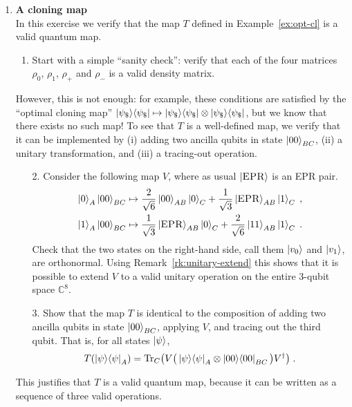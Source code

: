 \documentclass[12pt]{article}
\begin{document}
\begin{enumerate}
\item {\bf A cloning map}\label{ex:2-qmamp}\\
In this exercise we verify that the map $T$ defined in Example~\ref{ex:opt-cl} is a valid quantum map. 
\begin{enumerate}
\item Start with a simple ``sanity check'': verify that each of the four matrices $\rho_0$, $\rho_1$, $\rho_+$ and $\rho_-$ is a valid density matrix. 
\end{enumerate}
However, this is not enough: for example, these conditions are satisfied by the ``optimal cloning map'' $\ket{\psi_\$}\!\bra{\psi_\$}\mapsto \ket{\psi_\$}\!\bra{\psi_\$}\otimes \ket{\psi_\$}\!\bra{\psi_\$}$, but we know that there exists no such map! To see that $T$ is a well-defined map, we verify that it can be implemented by (i) adding two ancilla qubits in state $\ket{00}_{BC}$, (ii) a unitary transformation, and (iii) a tracing-out operation. 
\begin{enumerate}
\item[2.] Consider the following map $V$, where as usual $\ket{\textsc{EPR}}$ is an EPR pair.  
\begin{align*}
\ket{0}_A \ket{00}_{BC} \mapsto \frac{2}{\sqrt{6}}\ket{00}_{AB}\ket{0}_C + \frac{1}{\sqrt{3}} \ket{\textsc{EPR}}_{AB} \ket{1}_C \;,\\
\ket{1}_A \ket{00}_{BC} \mapsto  \frac{1}{\sqrt{3}} \ket{\textsc{EPR}}_{AB}\ket{0}_C + \frac{2}{\sqrt{6}}\ket{11}_{AB}\ket{1}_C \;.
\end{align*}
Check that  the two states on the right-hand side, call them $\ket{v_0}$ and $\ket{v_1}$, are orthonormal. Using Remark~\ref{rk:unitary-extend} this shows that it is possible to extend $V$ to a valid unitary operation on the entire $3$-qubit space $\mathbb{C}^8$. 
\item[3.] Show that the map $T$ is identical to the composition of adding two ancilla qubits in state $\ket{00}_{BC}$, applying $V$, and tracing out the third qubit. That is, for all states $\ket{\psi}$,
\[T(\ket{\psi}\!\bra{\psi}_A) = \mathrm{Tr}_C \big( V\big( \ket{\psi}\!\bra{\psi}_A \otimes \ket{00}\!\bra{00}_{BC} \big) V^\dagger \big) \;.\]
\end{enumerate}
This justifies that $T$ is a valid quantum map, because it can be written as a sequence of three valid operations.



\end{enumerate}
\end{document}
